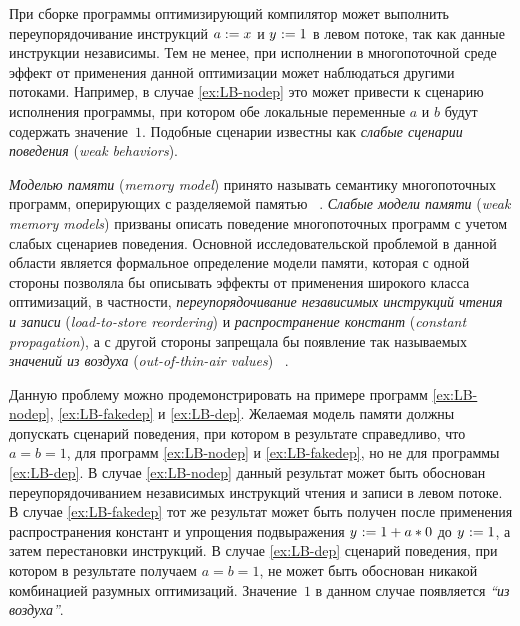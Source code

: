 При сборке программы оптимизирующий компилятор
может выполнить переупорядочивание инструкций
$a \;{:=}\;{x}^{}$ и ${y}^{}\;{:=}\;1$ в левом потоке, 
так как данные инструкции независимы. 
Тем не менее, при исполнении в многопоточной среде 
эффект от применения данной оптимизации  
может наблюдаться другими потоками. 
Например, в случае \ref{ex:LB-nodep} 
это может привести к сценарию исполнения программы,
при котором обе локальные переменные $a$ и $b$
будут содержать значение~$1$. Подобные сценарии известны как 
\emph{слабые сценарии поведения} (\emph{weak behaviors}).

\emph{Моделью памяти} (\emph{memory model}) принято называть семантику 
многопоточных программ, оперирующих с разделяемой памятью%
~\cite{Moiseenko-al:PCS21}. 
\emph{Слабые модели памяти} (\emph{weak memory models}) 
призваны описать поведение многопоточных программ 
с учетом слабых сценариев поведения. 
Основной исследовательской проблемой в данной области
является формальное определение модели памяти, 
которая с одной стороны позволяла бы описывать 
эффекты от применения широкого класса оптимизаций, 
в частности, \emph{переупорядочивание независимых инструкций чтения и записи}
(\emph{load-to-store reordering}) и 
\emph{распространение констант} (\emph{constant propagation}),
а с другой стороны запрещала бы появление 
так называемых \emph{значений из воздуха} (\emph{out-of-thin-air values})%
~\cite{Moiseenko-al:PCS21,Batty-al:ESOP15}.

Данную проблему можно продемонстрировать на примере 
программ \ref{ex:LB-nodep}, \ref{ex:LB-fakedep} и \ref{ex:LB-dep}.
Желаемая модель памяти должны допускать сценарий 
поведения, при котором в результате справедливо, что $a = b = 1$,
для программ \ref{ex:LB-nodep} и \ref{ex:LB-fakedep}, 
но не для программы \ref{ex:LB-dep}.
В случае \ref{ex:LB-nodep} данный результат может быть 
обоснован переупорядочиванием независимых инструкций чтения и записи
в левом потоке. В случае \ref{ex:LB-fakedep} тот же результат 
может быть получен после применения распространения констант
и упрощения подвыражения ${y}^{}\;{:=}\;1 + a * 0$ до ${y}^{}\;{:=}\;1$,
а затем перестановки инструкций. 
В случае \ref{ex:LB-dep} сценарий поведения, 
при котором в результате получаем $a = b = 1$,
не может быть обоснован никакой комбинацией разумных оптимизаций.
Значение~$1$ в данном случае появляется \emph{``из воздуха''}.

